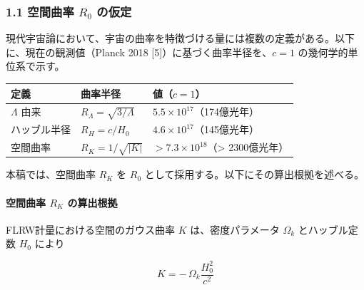 \documentclass[
  a4paper,11pt]{ltjsarticle}
\newcounter{none}
\theoremstyle{definition}
\theoremstyle{remark}
\begin{document}
\subsubsection{\texorpdfstring{1.1 空間曲率 \(R_0\)
の仮定}{1.1 空間曲率 R\_0 の仮定}}\label{ux7a7aux9593ux66f2ux7387-r_0-ux306eux4eeeux5b9a}

現代宇宙論において、宇宙の曲率を特徴づける量には複数の定義がある。以下に、現在の観測値（Planck
2018 {[}5{]}）に基づく曲率半径を、\(c = 1\) の幾何学的単位系で示す。

{\def\LTcaptype{none} %
\begin{longtable}[]{@{}
  >{\raggedright\arraybackslash}p{}
  >{\raggedright\arraybackslash}p{}
  >{\raggedright\arraybackslash}p{}@{}}
\toprule\noalign{}
\begin{minipage}[b]{\linewidth}\raggedright
定義
\end{minipage} & \begin{minipage}[b]{\linewidth}\raggedright
曲率半径
\end{minipage} & \begin{minipage}[b]{\linewidth}\raggedright
値（\(c=1\)）
\end{minipage} \\
\midrule\noalign{}
\endhead
\bottomrule\noalign{}
\endlastfoot
\(\Lambda\) 由来 & \(R_\Lambda = \sqrt{3/\Lambda}\) &
\(5.5 \times 10^{17}\)（174億光年） \\
ハッブル半径 & \(R_H = c/H_0\) & \(4.6 \times 10^{17}\)（145億光年） \\
空間曲率 & \(R_K = 1/\sqrt{\lvert K \rvert}\) &
\(> 7.3 \times 10^{18}\)（\textgreater{} 2300億光年） \\
\end{longtable}
}

本稿では、空間曲率 \(R_K\) を \(R_0\)
として採用する。以下にその算出根拠を述べる。

\paragraph{\texorpdfstring{空間曲率 \(R_K\)
の算出根拠}{空間曲率 R\_K の算出根拠}}\label{ux7a7aux9593ux66f2ux7387-r_k-ux306eux7b97ux51faux6839ux62e0}

FLRW計量における空間のガウス曲率 \(K\) は、密度パラメータ \(\Omega_k\)
とハッブル定数 \(H_0\) により

\[K = -\,\Omega_k \frac{H_0^2}{c^2}\]
\end{document}

